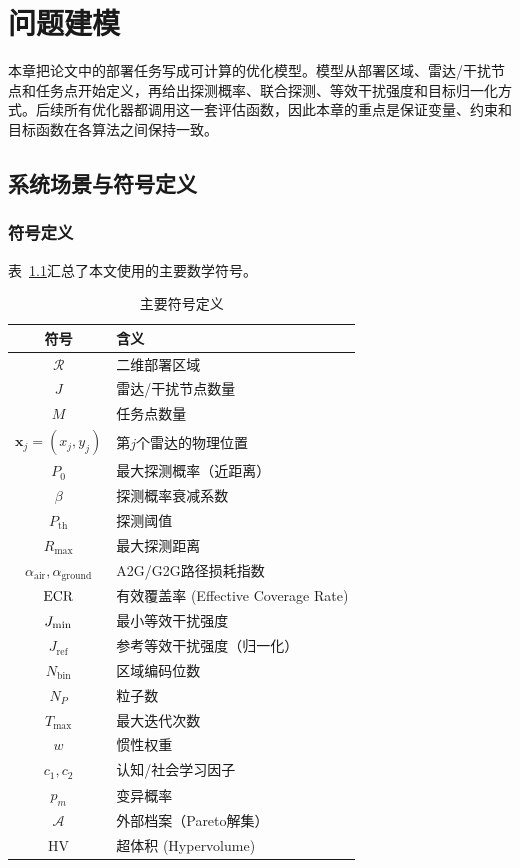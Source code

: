\chapter{问题建模}\label{chap:model}

本章把论文中的部署任务写成可计算的优化模型。模型从部署区域、雷达/干扰节点和任务点开始定义，再给出探测概率、联合探测、等效干扰强度和目标归一化方式。后续所有优化器都调用这一套评估函数，因此本章的重点是保证变量、约束和目标函数在各算法之间保持一致。

\section{系统场景与符号定义}

\subsection{符号定义}

表~\ref{tab:notation}汇总了本文使用的主要数学符号。

\begin{table}[!htbp]
\centering
\caption{主要符号定义}
\label{tab:notation}
\begin{tabular}{cl}
\toprule
符号 & 含义 \\
\midrule
$\mathcal{R}$ & 二维部署区域 \\
$J$ & 雷达/干扰节点数量 \\
$M$ & 任务点数量 \\
$\mathbf{x}_j = (x_j, y_j)$ & 第$j$个雷达的物理位置 \\
$P_0$ & 最大探测概率（近距离） \\
$\beta$ & 探测概率衰减系数 \\
$P_{\text{th}}$ & 探测阈值 \\
$R_{\max}$ & 最大探测距离 \\
$\alpha_{\text{air}}, \alpha_{\text{ground}}$ & A2G/G2G路径损耗指数 \\
$\text{ECR}$ & 有效覆盖率 (Effective Coverage Rate) \\
$J_{\text{min}}$ & 最小等效干扰强度 \\
$J_{\text{ref}}$ & 参考等效干扰强度（归一化） \\
$N_{\text{bin}}$ & 区域编码位数 \\
$N_P$ & 粒子数 \\
$T_{\max}$ & 最大迭代次数 \\
$w$ & 惯性权重 \\
$c_1, c_2$ & 认知/社会学习因子 \\
$p_m$ & 变异概率 \\
$\mathcal{A}$ & 外部档案（Pareto解集） \\
HV & 超体积 (Hypervolume) \\
\bottomrule
\end{tabular}
\end{table}

